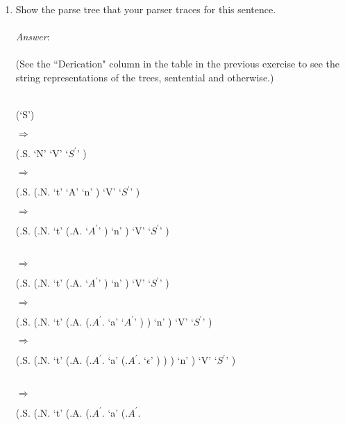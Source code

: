 \documentclass[fleqn]{article}
\begin{document}
\begin{enumerate}
  \item Show the parse tree that your parser traces for this sentence.\\\\
  \textit{Answer}:\\\\
  (See the ``Derication" column in the table in the previous exercise to see
  the string representations of the trees, sentential and otherwise.)\\\\
  \begin{parsetree}
    (`S')
  \end{parsetree}
  $\Longrightarrow$
  \begin{parsetree}
    (.S.
      `N'
      `V'
      `$S^{\prime}$'
    )
  \end{parsetree}
  $\Longrightarrow$
  \begin{parsetree}
    (.S.
      (.N.
        `t'
        `A'
        `n'
      )
      `V'
      `$S^{\prime}$'
    )
  \end{parsetree}
  $\Longrightarrow$
  \begin{parsetree}
    (.S.
      (.N.
        `t'
        (.A.
          `$A^{\prime}$'
        )
        `n'
      )
      `V'
      `$S^{\prime}$'
    )
  \end{parsetree}\\
  $\Longrightarrow$
  \begin{parsetree}
    (.S.
      (.N.
        `t'
        (.A.
          `$A^{\prime}$'
        )
        `n'
      )
      `V'
      `$S^{\prime}$'
    )
  \end{parsetree}
  $\Longrightarrow$
  \begin{parsetree}
    (.S.
      (.N.
        `t'
        (.A.
          (.$A^{\prime}$.
            `a'
            `$A^{\prime}$'
          )
        )
        `n'
      )
      `V'
      `$S^{\prime}$'
    )
  \end{parsetree}
  $\Longrightarrow$
  \begin{parsetree}
    (.S.
      (.N.
        `t'
        (.A.
          (.$A^{\prime}$.
            `a'
            (.$A^{\prime}$.
              `$\epsilon$'
            )
          )
        )
        `n'
      )
      `V'
      `$S^{\prime}$'
    )
  \end{parsetree}\\
  $\Longrightarrow$
  \begin{parsetree}
    (.S.
      (.N.
        `t'
        (.A.
          (.$A^{\prime}$.
            `a'
            (.$A^{\prime}$.

\end{parsetree}
\end{enumerate}
\end{document}
